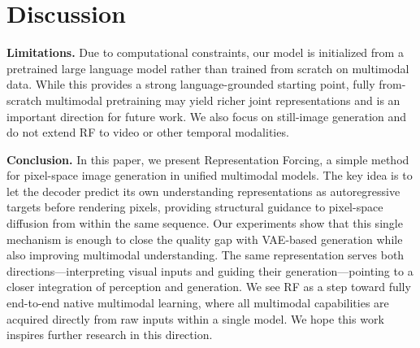 \section{Discussion}
\label{sec:discussion}

\textbf{Limitations.} Due to computational constraints, our model is initialized from a pretrained large language model rather than trained from scratch on multimodal data. While this provides a strong language-grounded starting point, fully from-scratch multimodal pretraining may yield richer joint representations and is an important direction for future work. We also focus on still-image generation and do not extend RF to video or other temporal modalities.



\textbf{Conclusion.}
In this paper, we present Representation Forcing, a simple method for pixel-space image generation in unified multimodal models. The key idea is to let the decoder predict its own understanding representations as autoregressive targets before rendering pixels, providing structural guidance to pixel-space diffusion from within the same sequence. Our experiments show that this single mechanism is enough to close the quality gap with VAE-based generation while also improving multimodal understanding. The same representation serves both directions---interpreting visual inputs and guiding their generation---pointing to a closer integration of perception and generation. We see RF as a step toward fully end-to-end native multimodal learning, where all multimodal capabilities are acquired directly from raw inputs within a single model. We hope this work inspires further research in this direction.
